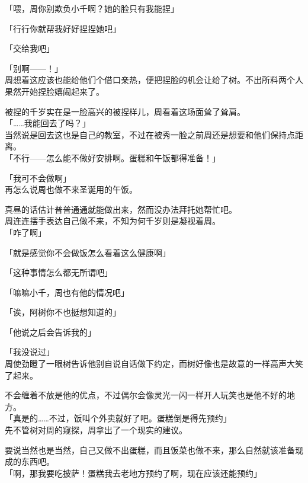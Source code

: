 「喂，周你别欺负小千啊？她的脸只有我能捏」

「行行你就帮我好好捏捏她吧」

「交给我吧」

「别啊——！」\\

周想着这应该也能给他们个借口亲热，便把捏脸的机会让给了树。不出所料两个人果然开始捏脸嬉闹起来了。

被捏的千岁实在是一脸高兴的被捏样儿，周看着这场面耸了耸肩。\\

「……我能回去了吗？」\\

当然说是回去这也是自己的教室，不过在被秀一脸之前周还是想要和他们保持点距离。\\

「不行——怎么能不做好安排啊。蛋糕和午饭都得准备！」

「我可不会做啊」\\

再怎么说周也做不来圣诞用的午饭。

真昼的话估计普普通通就能做出来，然而没办法拜托她帮忙吧。\\

周连连摆手表达自己做不来，不知为何千岁则是凝视着周。\\

「咋了啊」

「就是感觉你不会做饭怎么看着这么健康啊」

「这种事情怎么都无所谓吧」

「嘛嘛小千，周也有他的情况吧」

「诶，阿树你不也挺想知道的」

「他说之后会告诉我的」

「我没说过」\\

周使劲瞪了一眼树告诉他别自说自话做下约定，而树好像也是故意的一样高声大笑了起来。

不会缠着不放是他的优点，不过偶尔会像灵光一闪一样开人玩笑也是他不好的地方。\\

「真是的……不过，饭叫个外卖就好了吧。蛋糕倒是得先预约」\\

先不管树对周的窥探，周拿出了一个现实的建议。

要说当然也是当然，自己又做不出蛋糕，而且饭菜也做不来，那么自然就该准备现成的东西吧。\\

「啊，那我要吃披萨！蛋糕我去老地方预约了啊，现在应该还能预约」

